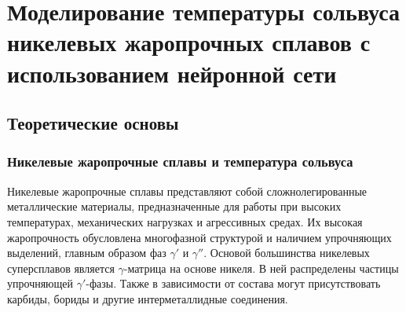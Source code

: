%
%
%
%
%
\chapter{Моделирование температуры сольвуса никелевых жаропрочных 
сплавов с использованием нейронной сети}

\section{Теоретические основы}

\subsection{Никелевые жаропрочные сплавы и температура сольвуса}

Никелевые жаропрочные сплавы представляют собой сложнолегированные 
металлические материалы, предназначенные для работы при высоких 
температурах, механических нагрузках и агрессивных средах. Их высокая 
жаропрочность обусловлена многофазной структурой и наличием упрочняющих 
выделений, главным образом фаз $\gamma'$ и $\gamma''$.
Основой большинства никелевых суперсплавов является $\gamma$-матрица 
на основе никеля. В ней распределены частицы упрочняющей 
$\gamma'$-фазы. Также в зависимости от состава могут присутствовать 
карбиды, бориды и другие интерметаллидные соединения.

